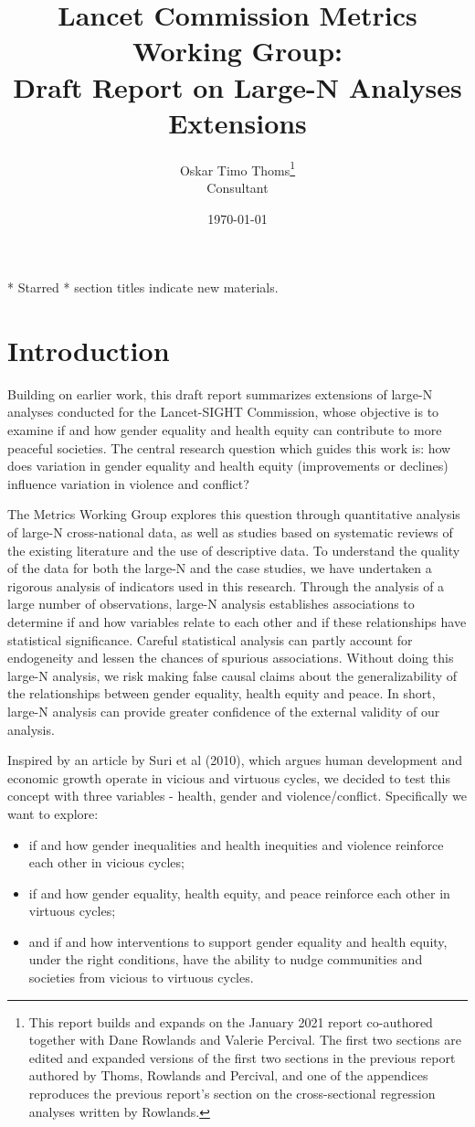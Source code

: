 \documentclass[12pt]{article}
\author{Oskar Timo Thoms\thanks{This report builds and expands on the January 2021 report co-authored together with Dane Rowlands and Valerie Percival. The first two sections are edited and expanded versions of the first two sections in the previous report authored by Thoms, Rowlands and Percival, and one of the appendices reproduces the previous report's section on the cross-sectional regression analyses written by Rowlands.}\\Consultant}
\title{Lancet Commission Metrics Working Group:\\Draft Report on Large-N Analyses Extensions}
\date{\today}
\begin{document}
\maketitle
\clearpage
\tableofcontents
\bigskip
\begin{center}
* Starred * section titles indicate new materials.
\end{center}

\clearpage

\section{Introduction}
\label{intro}

Building on earlier work, this draft report summarizes extensions of large-N analyses conducted for the Lancet-SIGHT Commission, whose objective is to examine if and how gender equality and health equity can contribute to more peaceful societies.
The central research question which guides this work is: how does variation in gender equality and health equity (improvements or declines) influence variation in violence and conflict?

The Metrics Working Group explores this question through quantitative analysis of large-N cross-national data, as well as studies based on systematic reviews of the existing literature and the use of descriptive data. To understand the quality of the data for both the large-N and the case studies, we have undertaken a rigorous analysis of indicators used in this research.
Through the analysis of a large number of observations, large-N analysis establishes associations to determine if and how variables relate to each other and if these relationships have statistical significance. Careful statistical analysis can partly account for endogeneity and lessen the chances of spurious associations. Without doing this large-N analysis, we risk making false causal claims about the generalizability of the relationships between gender equality, health equity and peace. In short, large-N analysis can provide greater confidence of the external validity of our analysis.

Inspired by an article by Suri et al (2010), which argues human development and economic growth operate in vicious and virtuous cycles, we decided to test this concept with three variables - health, gender and violence/conflict. Specifically we want to explore:
\begin{itemize}
\item if and how gender inequalities and health inequities and violence reinforce each other in vicious cycles;
\item if and how gender equality, health equity, and peace reinforce each other in virtuous cycles;
\item and if and how interventions to support gender equality and health equity, under the right conditions, have the ability to nudge communities and societies from vicious to virtuous cycles.
\end{itemize}
\end{document}
